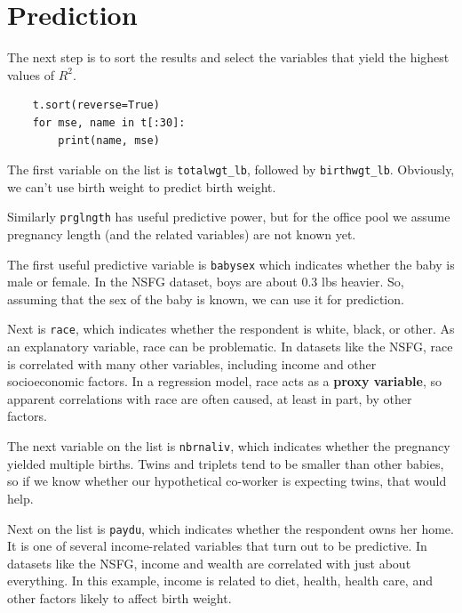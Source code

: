 \documentclass[12pt]{book}
\begin{document}
\section{Prediction}

The next step is to sort the results and select the variables that
yield the highest values of $R^2$.

\begin{verbatim}
    t.sort(reverse=True)
    for mse, name in t[:30]:
        print(name, mse)
\end{verbatim}

The first variable on the list is \verb"totalwgt_lb",
followed by \verb"birthwgt_lb".  Obviously, we can't use birth
weight to predict birth weight.

Similarly {\tt prglngth} has useful predictive power, but for the
office pool we assume pregnancy length (and the related variables)
are not known yet.

The first useful predictive variable is {\tt babysex} which indicates
whether the baby is male or female.  In the NSFG dataset, boys are
about 0.3 lbs heavier.  So, assuming that the sex of the baby is
known, we can use it for prediction.

Next is {\tt race}, which indicates whether the respondent is white,
black, or other.  As an explanatory variable, race can be problematic.
In datasets like the NSFG, race is correlated with many other
variables, including income and other socioeconomic factors.  In a
regression model, race acts as a {\bf proxy variable},
so apparent correlations with race are often caused, at least in
part, by other factors.

The next variable on the list is {\tt nbrnaliv}, which indicates
whether the pregnancy yielded multiple births.  Twins and triplets
tend to be smaller than other babies, so if we know whether our
hypothetical co-worker is expecting twins, that would help.

Next on the list is {\tt paydu}, which indicates whether the
respondent owns her home.  It is one of several income-related
variables that turn out to be predictive.  In datasets like the NSFG,
income and wealth are correlated with just about everything.  In this
example, income is related to diet, health, health care, and other
factors likely to affect birth weight.
\end{document}

